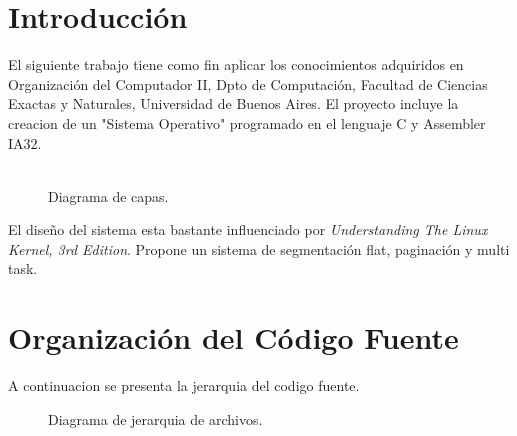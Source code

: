 \documentclass[a4paper,10pt]{article}
\begin{document}
\newpage
\tableofcontents
\newpage



\section{Introducci\'on}
El siguiente trabajo tiene como fin aplicar los conocimientos adquiridos en Organización del Computador II, Dpto de Computación, Facultad de Ciencias Exactas y Naturales, Universidad de Buenos Aires.	El proyecto incluye la creacion de un "Sistema Operativo" programado en el lenguaje C y Assembler IA32.
\\
\\
\begin{figure}[H]
\centering
{}
\caption{Diagrama de capas.}
\end{figure}

El diseño del sistema esta bastante influenciado por \emph{Understanding The Linux Kernel, 3rd Edition}. Propone un sistema de segmentación flat, paginación y multi task.

\newpage
\section{Organizaci\'on del C\'odigo Fuente}
A continuacion se presenta la jerarquia del codigo fuente.

\begin{figure}[H]
\centering
{}
\caption{Diagrama de jerarquia de archivos.}
\end{figure}
\end{document}
